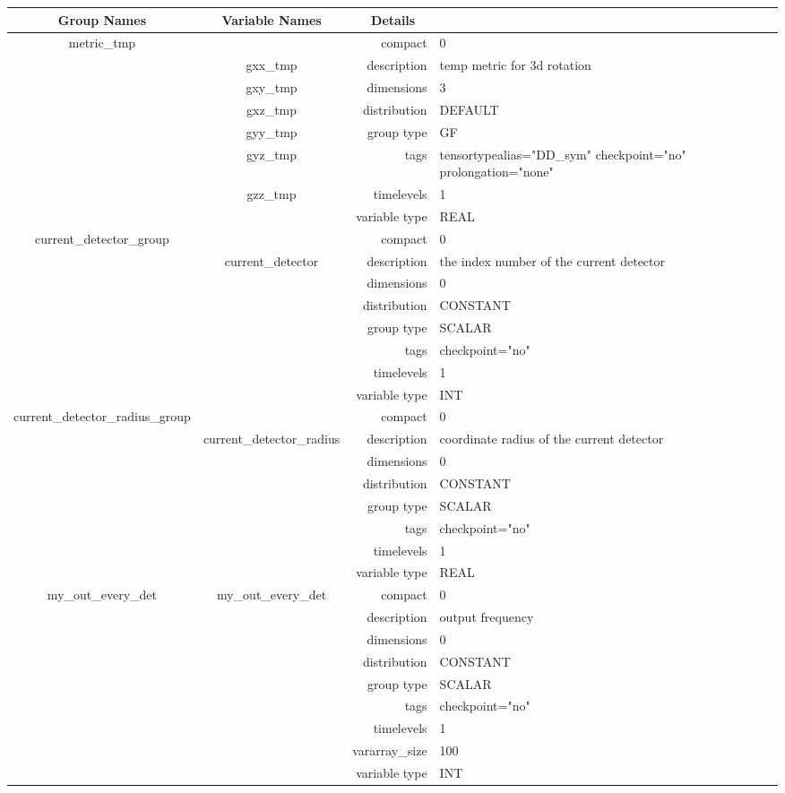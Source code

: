 \documentclass{article}
\begin{document}
\vspace{5mm}
\vspace{5mm}

\begin{tabular*}{150mm}{|c|c@{\extracolsep{\fill}}|rl|} \hline 
~ {\bf Group Names} ~ & ~ {\bf Variable Names} ~  &{\bf Details} ~ & ~ \\ 
\hline 
metric\_tmp &  & compact & 0 \\ 
 & gxx\_tmp & description & temp metric for 3d rotation \\ 
 & gxy\_tmp & dimensions & 3 \\ 
 & gxz\_tmp & distribution & DEFAULT \\ 
 & gyy\_tmp & group type & GF \\ 
 & gyz\_tmp & tags & tensortypealias="DD\_sym" checkpoint="no" prolongation="none" \\ 
 & gzz\_tmp & timelevels & 1 \\ 
 &  & variable type & REAL \\ 
\hline 
current\_detector\_group &  & compact & 0 \\ 
 & current\_detector & description & the index number of the current detector \\ 
 &  & dimensions & 0 \\ 
 &  & distribution & CONSTANT \\ 
 &  & group type & SCALAR \\ 
 &  & tags & checkpoint="no" \\ 
 &  & timelevels & 1 \\ 
 &  & variable type & INT \\ 
\hline 
current\_detector\_radius\_group &  & compact & 0 \\ 
 & current\_detector\_radius & description & coordinate radius of the current detector \\ 
 &  & dimensions & 0 \\ 
 &  & distribution & CONSTANT \\ 
 &  & group type & SCALAR \\ 
 &  & tags & checkpoint="no" \\ 
 &  & timelevels & 1 \\ 
 &  & variable type & REAL \\ 
\hline 
my\_out\_every\_det & my\_out\_every\_det & compact & 0 \\ 
 &  & description & output frequency \\ 
 &  & dimensions & 0 \\ 
 &  & distribution & CONSTANT \\ 
 &  & group type & SCALAR \\ 
 &  & tags & checkpoint="no" \\ 
 &  & timelevels & 1 \\ 
 &  & vararray\_size & 100 \\ 
 &  & variable type & INT \\ 
\hline 
\end{tabular*} 
\end{document}
